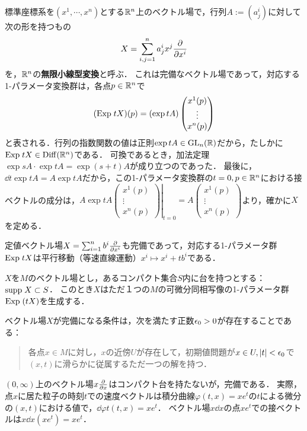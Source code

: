 \documentclass[uplatex,dvipdfmx]{jsreport}
\begin{document}
\begin{example}
    標準座標系を$(x^1,\cdots,x^n)$とする$\mathbb{R}^n$上のベクトル場で，行列$A:=(a^i_j)$に対して次の形を持つもの
    \[X=\sum^n_{i,j=1}a^i_jx^j\frac{\partial }{\partial x^i}\]
    を，$\mathbb{R}^n$の\textbf{無限小線型変換}と呼ぶ．
    これは完備なベクトル場であって，対応する1-パラメータ変換群は，各点$p\in\mathbb{R}^n$で
    \[(\mathrm{Exp}\; tX)(p)=(\exp tA)\begin{pmatrix}x^1(p)\\\vdots\\x^n(p)\end{pmatrix}\]
    と表される．行列の指数関数の値は正則$\exp tA\in\mathrm{GL}_n(\mathbb{R})$だから，たしかに$\mathrm{Exp}\; tX\in\mathrm{Diff}(\mathbb{R}^n)$である．
    可換であるとき，加法定理$\exp sA\cdot\exp tA=\exp(s+t)A$が成り立つのであった．
    最後に，$\dd{}{t}\exp tA=A\exp tA$だから，この1-パラメータ変換群の$t=0,p\in\mathbb{R}^n$における接ベクトルの成分は，$A\exp tA\left.\begin{pmatrix}x^1(p)\\\vdots\\x^n(p)\end{pmatrix}\right|_{t=0}=A\begin{pmatrix}x^1(p)\\\vdots\\x^n(p)\end{pmatrix}$より，確かに$X$を定める．
\end{example}

\begin{example}
    定値ベクトル場$X=\sum^n_{i=1}b^i\frac{\partial }{\partial x^i}$も完備であって，対応する1-パラメータ群$\mathrm{Exp}\; tX$は平行移動（等速直線運動）$x^i\mapsto x^i+tb^i$である．
\end{example}

\begin{theorem}
    $X$を$M$のベクトル場とし，あるコンパクト集合$S$内に台を持つとする：$\mathrm{supp}\; X\subset S$．
    このとき$X$はただ１つの$M$の可微分同相写像の1-パラメータ群$\mathrm{Exp}\;(tX)$を生成する．
\end{theorem}

\begin{corollary}[精緻化]
    ベクトル場$X$が完備になる条件は，次を満たす正数$\epsilon_0>0$が存在することである：
    \begin{quote}
        各点$x\in M$に対し，$x$の近傍$U$が存在して，初期値問題が$x\in U,\lvert t\rvert<\epsilon_0$で$(x,t)$に滑らかに従属するただ一つの解を持つ．
    \end{quote}
\end{corollary}

\begin{example}
    $(0,\infty)$上のベクトル場$x\frac{\partial }{\partial x}$はコンパクト台を持たないが，完備である．
    実際，点$x$に居た粒子の時刻$t$での速度ベクトルは積分曲線$\varphi(t,x)=xe^t$の$t$による微分の$(x,t)$における値で，$\dd{\varphi}{t}(t,x)=xe^t$．
    ベクトル場$x\dd{}{x}$の点$xe^t$での接ベクトルは$x\dd{}{x}(xe^t)=xe^t$．
\end{example}
\end{document}
